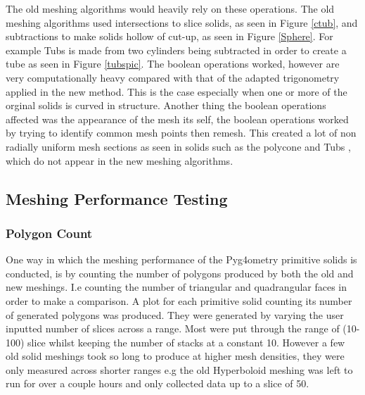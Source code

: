 \documentclass[12pt,a4paper]{article}
\begin{document}
\noindent The old meshing algorithms would heavily rely on these operations. The old meshing algorithms used intersections to slice solids, as seen in Figure \ref{ctub}, and subtractions to make solids hollow of cut-up, as seen in Figure \ref{Sphere}. For example Tubs is made from two cylinders being subtracted in order to create a tube as seen in Figure \ref{tubspic}. The boolean operations worked, however are very computationally heavy compared with that of the adapted trigonometry applied in the new method. This is the case especially when one or more of the orginal solids is curved in structure. Another thing the boolean operations affected was the appearance of the mesh its self, the boolean operations worked by trying to identify common mesh points then remesh. This created a lot of non radially uniform mesh sections as seen in solids such as the polycone and Tubs , which do not appear in the new meshing algorithms.\\



\newpage
\subsection{Meshing Performance Testing}
\subsubsection{Polygon Count}
One way in which the meshing performance of the Pyg4ometry primitive solids is conducted, is by counting the number of polygons produced by both the old and new meshings. I.e counting the number of triangular and quadrangular faces in order to make a comparison. A plot for each primitive solid counting its number of generated polygons was produced. They were generated by varying the user inputted number of slices across a range. Most were put through the range of (10-100) slice whilst keeping the number of stacks at a constant 10. However a few old solid meshings took so long to produce at higher mesh densities, they were only measured across shorter ranges e.g the old Hyperboloid meshing was left to run for over a couple hours and only collected data up to a slice of 50.  \\
\end{document}
